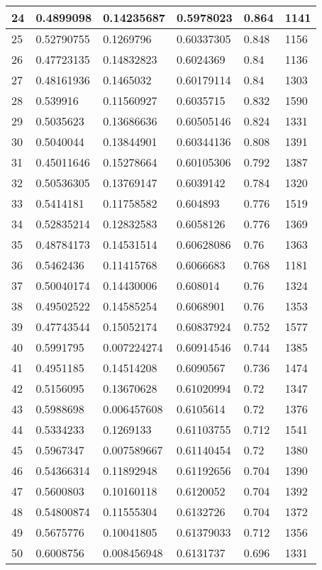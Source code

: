 \begin{longtable}{|l|l|l|l|l|l|}
24 & 0.4899098 & 0.14235687 & 0.5978023 & 0.864 & 1141 \\ \hline 
25 & 0.52790755 & 0.1269796 & 0.60337305 & 0.848 & 1156 \\ \hline 
26 & 0.47723135 & 0.14832823 & 0.6024369 & 0.84 & 1136 \\ \hline 
27 & 0.48161936 & 0.1465032 & 0.60179114 & 0.84 & 1303 \\ \hline 
28 & 0.539916 & 0.11560927 & 0.6035715 & 0.832 & 1590 \\ \hline 
29 & 0.5035623 & 0.13686636 & 0.60505146 & 0.824 & 1331 \\ \hline 
30 & 0.5040044 & 0.13844901 & 0.60344136 & 0.808 & 1391 \\ \hline 
31 & 0.45011646 & 0.15278664 & 0.60105306 & 0.792 & 1387 \\ \hline 
32 & 0.50536305 & 0.13769147 & 0.6039142 & 0.784 & 1320 \\ \hline 
33 & 0.5414181 & 0.11758582 & 0.604893 & 0.776 & 1519 \\ \hline 
34 & 0.52835214 & 0.12832583 & 0.6058126 & 0.776 & 1369 \\ \hline 
35 & 0.48784173 & 0.14531514 & 0.60628086 & 0.76 & 1363 \\ \hline 
36 & 0.5462436 & 0.11415768 & 0.6066683 & 0.768 & 1181 \\ \hline 
37 & 0.50040174 & 0.14430006 & 0.608014 & 0.76 & 1324 \\ \hline 
38 & 0.49502522 & 0.14585254 & 0.6068901 & 0.76 & 1353 \\ \hline 
39 & 0.47743544 & 0.15052174 & 0.60837924 & 0.752 & 1577 \\ \hline 
40 & 0.5991795 & 0.007224274 & 0.60914546 & 0.744 & 1385 \\ \hline 
41 & 0.4951185 & 0.14514208 & 0.6090567 & 0.736 & 1474 \\ \hline 
42 & 0.5156095 & 0.13670628 & 0.61020994 & 0.72 & 1347 \\ \hline 
43 & 0.5988698 & 0.006457608 & 0.6105614 & 0.72 & 1376 \\ \hline 
44 & 0.5334233 & 0.1269133 & 0.61103755 & 0.712 & 1541 \\ \hline 
45 & 0.5967347 & 0.007589667 & 0.61140454 & 0.72 & 1380 \\ \hline 
46 & 0.54366314 & 0.11892948 & 0.61192656 & 0.704 & 1390 \\ \hline 
47 & 0.5600803 & 0.10160118 & 0.6120052 & 0.704 & 1392 \\ \hline 
48 & 0.54800874 & 0.11555304 & 0.6132726 & 0.704 & 1372 \\ \hline 
49 & 0.5675776 & 0.10041805 & 0.61379033 & 0.712 & 1356 \\ \hline 
50 & 0.6008756 & 0.008456948 & 0.6131737 & 0.696 & 1331 \\ \hline 
\end{longtable}